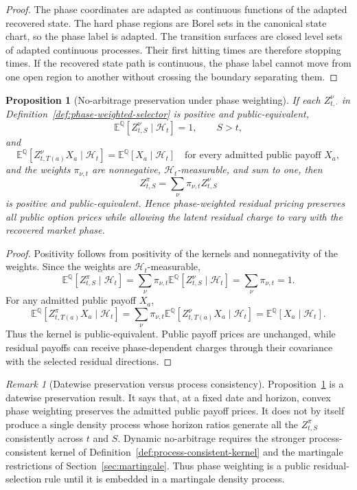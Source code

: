 \documentclass[11pt,a4paper]{amsart}
\theoremstyle{plain}
\newtheorem{proposition}[theorem]{Proposition}
\theoremstyle{definition}
\theoremstyle{remark}
\newtheorem{remark}[theorem]{Remark}
\newcommand{\QQ}{\mathbb{Q}}
\newcommand{\EE}{\mathbb{E}}
\newcommand{\cH}{\mathcal{H}}
\begin{document}
\begin{proof}
The phase coordinates are adapted as continuous functions of the adapted recovered state.  The
hard phase regions are Borel sets in the canonical state chart, so the phase label is adapted.
The transition surfaces are closed level sets of adapted continuous processes.  Their first
hitting times are therefore stopping times.  If the recovered state path is continuous, the phase
label cannot move from one open region to another without crossing the boundary separating them.
\end{proof}

\begin{proposition}[No-arbitrage preservation under phase weighting]\label{prop:phase-weighting-noarbitrage}
If each \(Z_{t,\cdot}^{\nu}\) in Definition~\ref{def:phase-weighted-selector} is positive and
public-equivalent,
\[
        \EE^\QQ[Z_{t,S}^{\nu}\mid\cH_t]=1,
        \qquad S>t,
\]
and
\[
        \EE^\QQ[Z_{t,T(a)}^{\nu}X_a\mid\cH_t]
        =
        \EE^\QQ[X_a\mid\cH_t]
        \quad
        \text{for every admitted public payoff }X_a,
\]
and the weights \(\pi_{\nu,t}\) are nonnegative, \(\cH_t\)-measurable, and sum to one, then
\[
        Z_{t,S}^{\pi}
        =
        \sum_\nu\pi_{\nu,t}Z_{t,S}^{\nu}
\]
is positive and public-equivalent.  Hence phase-weighted residual pricing preserves all public
option prices while allowing the latent residual charge to vary with the recovered market phase.
\end{proposition}

\begin{proof}
Positivity follows from positivity of the kernels and nonnegativity of the weights.  Since the
weights are \(\cH_t\)-measurable,
\[
        \EE^\QQ[Z_{t,S}^{\pi}\mid\cH_t]
        =
        \sum_\nu
        \pi_{\nu,t}\EE^\QQ[Z_{t,S}^{\nu}\mid\cH_t]
        =
        \sum_\nu\pi_{\nu,t}
        =
        1 .
\]
For any admitted public payoff \(X_a\),
\[
        \EE^\QQ[Z_{t,T(a)}^{\pi}X_a\mid\cH_t]
        =
        \sum_\nu
        \pi_{\nu,t}\EE^\QQ[Z_{t,T(a)}^{\nu}X_a\mid\cH_t]
        =
        \EE^\QQ[X_a\mid\cH_t].
\]
Thus the kernel is public-equivalent.  Public payoff prices are unchanged, while residual payoffs
can receive phase-dependent charges through their covariance with the selected residual
directions.
\end{proof}

\begin{remark}[Datewise preservation versus process consistency]\label{rem:phase-datewise-process}
Proposition~\ref{prop:phase-weighting-noarbitrage} is a datewise preservation result.  It says
that, at a fixed date and horizon, convex phase weighting preserves the admitted public payoff
prices.  It does not by itself produce a single density process whose horizon ratios generate all
the \(Z_{t,S}^{\pi}\) consistently across \(t\) and \(S\).  Dynamic no-arbitrage requires the
stronger process-consistent kernel of Definition~\ref{def:process-consistent-kernel} and the
martingale restrictions of Section~\ref{sec:martingale}.  Thus phase weighting is a public
residual-selection rule until it is embedded in a martingale density process.
\end{remark}
\end{document}
